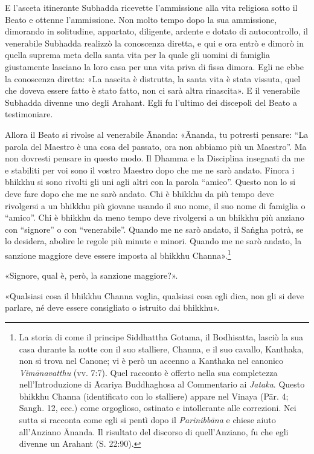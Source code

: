 E l’asceta itinerante Subhadda ricevette l’ammissione alla vita religiosa sotto
il Beato e ottenne l’ammissione. Non molto tempo dopo la sua ammissione,
dimorando in solitudine, appartato, diligente, ardente e dotato di
autocontrollo, il venerabile Subhadda realizzò la conoscenza diretta, e qui e
ora entrò e dimorò in quella suprema meta della santa vita per la quale gli
uomini di famiglia giustamente lasciano la loro casa per una vita priva di fissa
dimora. Egli ne ebbe la conoscenza diretta: «La nascita è distrutta, la santa
vita è stata vissuta, quel che doveva essere fatto è stato fatto, non ci sarà
altra rinascita». E il venerabile Subhadda divenne uno degli Arahant. Egli fu
l’ultimo dei discepoli del Beato a testimoniare.

Allora il Beato si rivolse al venerabile Ānanda: «Ānanda, tu potresti pensare:
“La parola del Maestro è una cosa del passato, ora non abbiamo più un Maestro”.
Ma non dovresti pensare in questo modo. Il Dhamma e la Disciplina insegnati da
me e stabiliti per voi sono il vostro Maestro dopo che me ne sarò andato. Finora
i bhikkhu si sono rivolti gli uni agli altri con la parola “amico”. Questo non
lo si deve fare dopo che me ne sarò andato. Chi è bhikkhu da più tempo deve
rivolgersi a un bhikkhu più giovane usando il suo nome, il suo nome di famiglia
o “amico”. Chi è bhikkhu da meno tempo deve rivolgersi a un bhikkhu più anziano
con “signore” o con “venerabile”. Quando me ne sarò andato, il Saṅgha potrà, se
lo desidera, abolire le regole più minute e minori. Quando me ne sarò andato, la
sanzione maggiore deve essere imposta al bhikkhu Channa».\footnote{La storia di
  come il principe Siddhattha Gotama, il Bodhisatta, lasciò la sua casa durante
  la notte con il suo stalliere, Channa, e il suo cavallo, Kanthaka, non si
  trova nel Canone; vi è però un accenno a Kanthaka nel canonico
  \emph{Vimānavatthu} (vv. 7:7). Quel racconto è offerto nella sua completezza
  nell’Introduzione di Ācariya Buddhaghosa al Commentario ai \emph{Jataka}.
  Questo bhikkhu Channa (identificato con lo stalliere) appare nel Vinaya (Pār.
  4; Sangh. 12, ecc.) come orgoglioso, ostinato e intollerante alle correzioni.
  Nei sutta si racconta come egli si pentì dopo il \emph{Parinibbāna} e chiese
  aiuto all’Anziano Ānanda. Il risultato del discorso di quell’Anziano, fu che
  egli divenne un Arahant (S. 22:90).}

«Signore, qual è, però, la sanzione maggiore?».

«Qualsiasi cosa il bhikkhu Channa voglia, qualsiasi cosa egli dica, non gli si
deve parlare, né deve essere consigliato o istruito dai bhikkhu».


